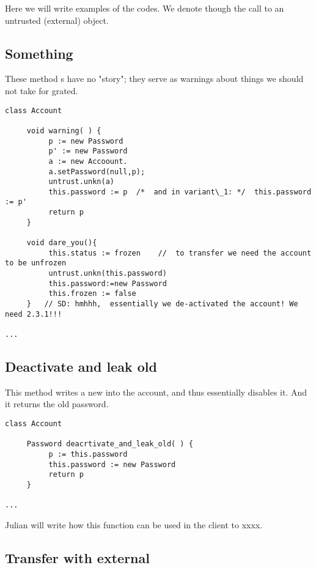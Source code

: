 
Here we will write examples of the codes. We denote though  the call to an untrusted (external) object.


\subsection{Something}

These  method s have no "story"; they serve  as warnings about things we should not take for grated.

\begin{lstlisting}[language=chainmail, mathescape=true, frame=lines]
class Account

     void warning( ) {
          p := new Password
          p' := new Password
          a := new Accoount.
          a.setPassword(null,p);
          untrust.unkn(a)
          this.password := p  /*  and in variant\_1: */  this.password := p' 
          return p    
     }
     
     void dare_you(){
          this.status := frozen    //  to transfer we need the account to be unfrozen 
          untrust.unkn(this.password)
          this.password:=new Password
          this.frozen := false
     }   // SD: hmhhh,  essentially we de-activated the account! We need 2.3.1!!!
     
...
\end{lstlisting}


\subsection*{Deactivate and leak old}

This method writes a new  into the account, and thus essentially disables it. And it returns the old password.

\begin{lstlisting}[language=chainmail, mathescape=true, frame=lines]
class Account

     Password deacrtivate_and_leak_old( ) {
          p := this.password
          this.password := new Password
          return p    
     }
     
...
\end{lstlisting}

Julian will write how this function can be used in the client to xxxx.

\subsection{Transfer with external}

